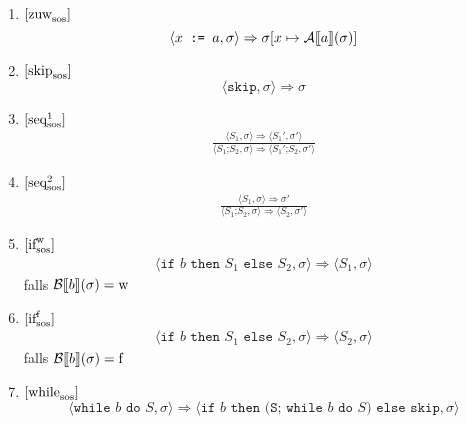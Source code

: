 \begin{enumerate}
    \item $\infruleSos{zuw}$
    \[
    \langle x \texttt{ := } a, \sigma \rangle \Rightarrow \sigma[x \mapsto \Asem{a}(\sigma)]
    \]

    \item $\infruleSos{skip}$
    \[
    \langle \texttt{skip}, \sigma \rangle \Rightarrow \sigma
    \]

    \item $\infruleSos[1]{seq}$
    \begin{align*}
        \frac{
            \langle S_1, \sigma \rangle \Rightarrow \langle S_1', \sigma' \rangle
        }{
            \langle S_1\texttt{;} S_2, \sigma \rangle \Rightarrow \langle S_1'\texttt{;} S_2, \sigma' \rangle
        }
    \end{align*}

    \item $\infruleSos[2]{seq}$
    \begin{align*}
        \frac{
            \langle S_1, \sigma \rangle \Rightarrow \sigma'
        }{
            \langle S_1\texttt{;} S_2, \sigma \rangle \Rightarrow \langle S_2, \sigma' \rangle
        }
    \end{align*}


    \item $\infruleSos[\true]{if}$
    \begin{align*}
        \langle \texttt{if } b \texttt{ then } S_1 \texttt{ else } S_2, \sigma \rangle \Rightarrow \langle S_1, \sigma \rangle
    \end{align*}
    falls $\Bsem{b}(\sigma) = \true$

    \item $\infruleSos[\false]{if}$
    \begin{align*}
        \langle \texttt{if } b \texttt{ then } S_1 \texttt{ else } S_2, \sigma \rangle \Rightarrow \langle S_2, \sigma \rangle
    \end{align*}
    falls $\Bsem{b}(\sigma) = \false$

    \item $\infruleSos{while}$
    \[
    \langle \texttt{while } b \texttt{ do } S, \sigma \rangle \Rightarrow \langle \texttt{if } b \texttt{ then } \texttt{(S; while } b \texttt{ do } S) \texttt{ else skip}, \sigma \rangle
    \]
\end{enumerate}

